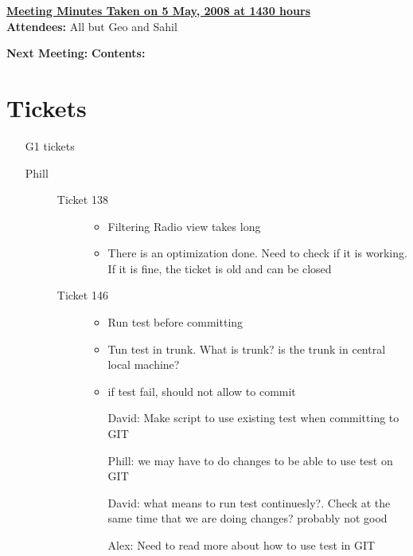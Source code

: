 \documentclass[a4paper,10pt]{article}
\begin{document}
{\large \textbf{\underline{Meeting Minutes Taken on 5 May, 2008 at 1430 hours}}}\\

\textbf{Attendees:} All but Geo and Sahil

\textbf{Next Meeting:} 
\textbf{Contents:}

\section*{Tickets}

\begin{enumerate}
\item[G1 tickets]
	\begin{description}
	 \item[Phill] \begin{description}
	               \item[Ticket 138] \begin{itemize}
	                           \item Filtering Radio view takes long
                                   \item There is an optimization done.  Need to check if it is working.  If it is fine, the ticket is old and can be closed
	                          \end{itemize}
	              \item[Ticket 146]  \begin{itemize}
	                           \item Run test before committing
	                           \item Tun test in trunk. What is trunk? is the trunk in central local machine?
	                           \item if test fail, should not allow to commit
	                           \item[David:] Make script to use existing test when committing to GIT
	                           \item[Phill:] we may have to do changes to be able to use test on GIT
	                           \item[David:] what means to run test continuesly?.  Check at the same time that we are doing changes? probably not good 
	                           \item[Alex:] Need to read more about how to use test in GIT
	                          \end{itemize}


 	              \end{description}


\end{description}
\end{enumerate}
\end{document}
